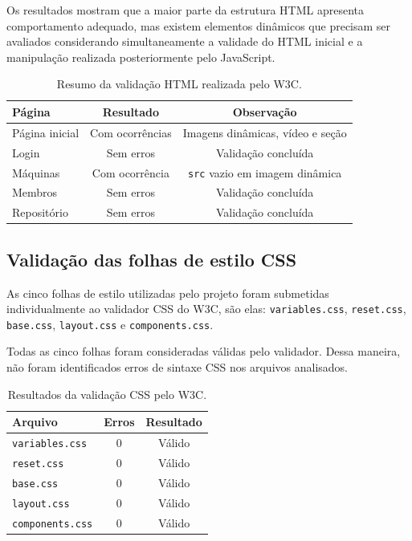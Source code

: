 Os resultados mostram que a maior parte da estrutura HTML apresenta comportamento adequado, mas existem elementos dinâmicos que precisam ser avaliados considerando simultaneamente a validade do HTML inicial e a manipulação realizada posteriormente pelo JavaScript.

\begin{table}[H]
	\centering
	\caption{Resumo da validação HTML realizada pelo W3C.}
	\label{tab:w3c-html}
	\begin{tabular}{lcc}
		\hline
		\textbf{Página} & \textbf{Resultado} & \textbf{Observação} \\
		\hline
		Página inicial & Com ocorrências & Imagens dinâmicas, vídeo e seção \\
		Login & Sem erros & Validação concluída \\
		Máquinas & Com ocorrência & \texttt{src} vazio em imagem dinâmica \\
		Membros & Sem erros & Validação concluída \\
		Repositório & Sem erros & Validação concluída \\
		\hline
	\end{tabular}
\end{table}
\vspace{5mm}
\subsection{Validação das folhas de estilo CSS}

As cinco folhas de estilo utilizadas pelo projeto foram submetidas individualmente ao validador CSS do W3C, são elas: \texttt{variables.css}, \texttt{reset.css}, \texttt{base.css}, \texttt{layout.css} e \texttt{components.css}.

Todas as cinco folhas foram consideradas válidas pelo validador. Dessa maneira, não foram identificados erros de sintaxe CSS nos arquivos analisados.

\begin{table}[H]
	\centering
	\caption{Resultados da validação CSS pelo W3C.}
	\label{tab:w3c-css}
	\begin{tabular}{lcc}
		\hline
		\textbf{Arquivo} & \textbf{Erros} & \textbf{Resultado} \\
		\hline
		\texttt{variables.css} & 0 & Válido \\
		\texttt{reset.css} & 0 & Válido \\
		\texttt{base.css} & 0 & Válido \\
		\texttt{layout.css} & 0 & Válido \\
		\texttt{components.css} & 0 & Válido \\
		\hline
	\end{tabular}
\end{table}

